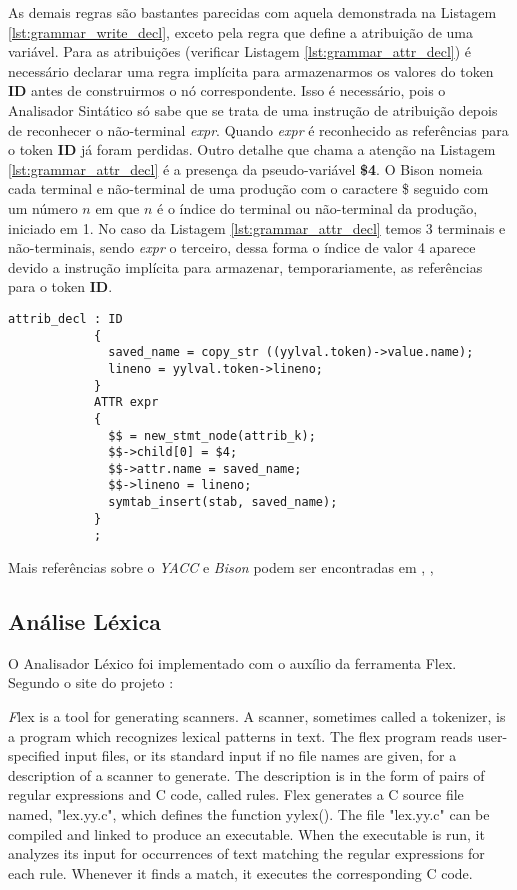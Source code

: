 As demais regras são bastantes parecidas com aquela demonstrada na Listagem
\ref{lst:grammar_write_decl}, exceto pela regra que define a atribuição de uma
variável. Para as atribuições (verificar Listagem \ref{lst:grammar_attr_decl})
é necessário declarar uma regra implícita para armazenarmos os valores do token
\textbf{ID} antes de construirmos o nó correspondente. Isso é necessário, pois
o Analisador Sintático só sabe que se trata de uma instrução de atribuição
depois de reconhecer o não-terminal \emph{expr}. Quando \emph{expr} é
reconhecido as referências para o token \textbf{ID} já foram perdidas. Outro
detalhe que chama a atenção na Listagem \ref{lst:grammar_attr_decl} é a
presença da pseudo-variável \textbf{\$4}. O Bison nomeia cada terminal e
não-terminal de uma produção com o caractere \$ seguido com um número $n$ em
que $n$ é o índice do terminal ou não-terminal da produção, iniciado em 1. No
caso da Listagem \ref{lst:grammar_attr_decl} temos 3 terminais e
não-terminais, sendo \emph{expr} o terceiro, dessa forma o índice de valor 4
aparece devido a instrução implícita para armazenar, temporariamente, as
referências para o token \textbf{ID}.

\begin{lstlisting}[label=lst:grammar_attr_decl,caption=Instrução de Atribuição]
attrib_decl : ID
            {
              saved_name = copy_str ((yylval.token)->value.name);
              lineno = yylval.token->lineno;
            }
            ATTR expr
            {
              $$ = new_stmt_node(attrib_k);
              $$->child[0] = $4;
              $$->attr.name = saved_name;
              $$->lineno = lineno;
              symtab_insert(stab, saved_name);
            }
            ;
\end{lstlisting}

Mais referências sobre o \emph{YACC} e \emph{Bison} podem ser encontradas em
, , 

\subsection{Análise Léxica}
O Analisador Léxico foi implementado com o auxílio da ferramenta Flex. Segundo
o site do projeto \cite{flex-project}:

\begin{citacao}{4cm}{0cm}\footnotesize \emph
  Flex is a tool for generating scanners. A scanner, sometimes called a
  tokenizer, is a program which recognizes lexical patterns in text. The flex
  program reads user-specified input files, or its standard input if no file
  names are given, for a description of a scanner to generate. The description
  is in the form of pairs of regular expressions and C code, called rules. Flex
  generates a C source file named, "lex.yy.c", which defines the function
  yylex(). The file "lex.yy.c" can be compiled and linked to produce an
  executable. When the executable is run, it analyzes its input for occurrences
  of text matching the regular expressions for each rule. Whenever it finds a
  match, it executes the corresponding C code.
\end{citacao}

